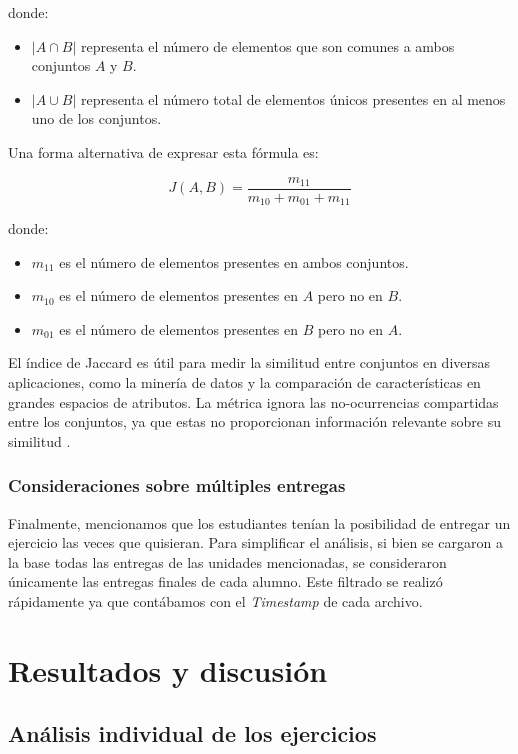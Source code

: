 \documentclass[11pt,a4paper,twoside,openany]{tesis}
\begin{document}
donde:
\begin{itemize}
    \item \( |A \cap B| \) representa el número de elementos que son comunes a ambos conjuntos \( A \) y \( B \).
    \item \( |A \cup B| \) representa el número total de elementos únicos presentes en al menos uno de los conjuntos.
\end{itemize}

Una forma alternativa de expresar esta fórmula es:

\[
J(A, B) = \frac{m_{11}}{m_{10} + m_{01} + m_{11}}
\]

donde:
\begin{itemize}
    \item \( m_{11} \) es el número de elementos presentes en ambos conjuntos.
    \item \( m_{10} \) es el número de elementos presentes en \( A \) pero no en \( B \).
    \item \( m_{01} \) es el número de elementos presentes en \( B \) pero no en \( A \).
\end{itemize}

El índice de Jaccard es útil para medir la similitud entre conjuntos en diversas aplicaciones, como la minería de datos y la comparación de características en grandes espacios de atributos. La métrica ignora las no-ocurrencias compartidas entre los conjuntos, ya que estas no proporcionan información relevante sobre su similitud \cite{jaccard}.


\subsection{Consideraciones sobre múltiples entregas}

Finalmente, mencionamos que los estudiantes tenían la posibilidad de entregar un ejercicio las veces que quisieran. Para simplificar el análisis, si bien se cargaron a la base todas las entregas de las unidades mencionadas, se consideraron únicamente las entregas finales de cada alumno. Este filtrado se realizó rápidamente ya que contábamos con el \emph{Timestamp} de cada archivo.


\chapter{Resultados y discusión}
\section{Análisis individual de los ejercicios}
\end{document}
